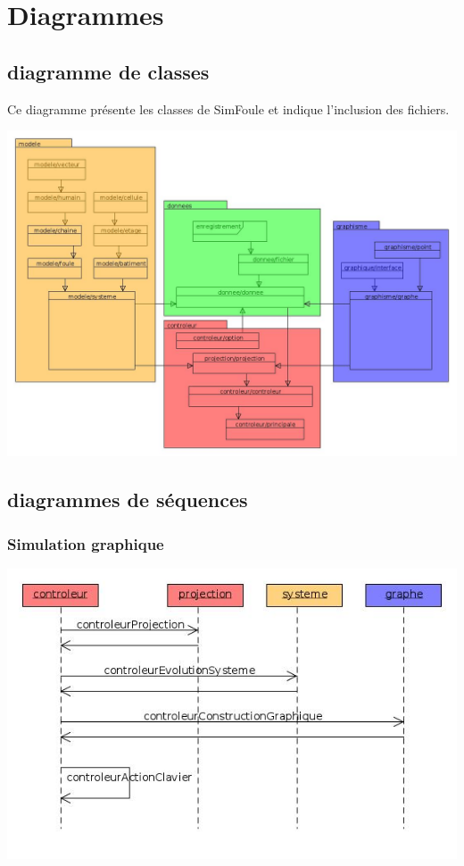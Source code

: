 %
\section{Diagrammes}
%
%
\subsection{diagramme de classes}
%
Ce diagramme présente les classes de SimFoule et indique l'inclusion des fichiers.
%
\begin{center}
\includegraphics[scale=0.45]{./illustration/classesSimFoule}
\end{center}
%
%
\subsection{diagrammes de séquences}
%
\subsubsection{Simulation graphique}
\begin{center}
\includegraphics[scale=0.51]{./illustration/sequenceControleur}
\end{center}
%
